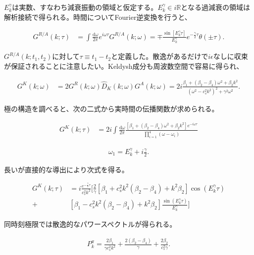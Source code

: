 \documentclass[a4paper,11pt]{ltjsarticle}
\numberwithin{equation}{section}
\newcommand{\dd}{\mathrm{d}}
\newcommand{\ee}{e}
\begin{document}
$E_k^\gamma$は実数、すなわち減衰振動の領域と仮定する。$E_k^\gamma\in i\mathbb R$となる過減衰の領域は解析接続で得られる。時間についてFourier逆変換を行うと、

\begin{align}\label{eq:retardedM4dissip}
G^{R/A} (k; \tau) &= \int \frac{\dd \omega}{2\pi} \ee^{i \omega \tau} G^{R/A} (k; \omega) = \mp \frac{\sin \left[E_k^{\gamma} \tau\right]}{E_k^{\gamma}} \ee^{- \frac{\gamma}{2}\tau}\theta\left(\pm \tau\right).
\end{align}

$G^{R/A}(k;t_1,t_2)$に対して$\tau\equiv t_1-t_2$と定義した。散逸があるだけで$i\epsilon$なしに収束が保証されることに注意したい。Keldysh成分も周波数空間で容易に得られ、

\begin{align}
G^{K} (k; \omega) &= 2 G^{R} (k; \omega) \widehat{D}_K (k; \omega) G^{A} (k; \omega) = 2 i \frac{\beta_1+ (\beta_{2}-\beta_{4}) \omega^2 + \beta_2 k^2 }{\left(\omega^2-c_s^2k^2\right)^2+\gamma^2 \omega^2}.
\end{align}

極の構造を調べると、次の二式から実時間の伝播関数が求められる。

\begin{align}
G^{K} (k; \tau) &= 2 i \int \frac{\dd \omega}{2\pi} \frac{\left[\beta_1+ (\beta_{2}-\beta_{4}) \omega^2 + \beta_2 k^2 \right] \ee^{-i\omega \tau}}{\prod_{i=1}^{4}(\omega-\omega_i)}
\end{align}


\begin{align}
\omega_1 = E_k^{\gamma} + i \frac{\gamma}{2}.
\end{align}

長いが直接的な導出により次式を得る。

\begin{align}\label{eq:distribM4dissip}
G^{K} (k; \tau) &= i \frac{\ee^{-\frac{\gamma}{2}\tau}}{c_s^2 k^2} \bigg[\frac{2}{\gamma} \left[\beta_1 +c_s^2 k^2  (\beta_{2}-\beta_{4})+ k^2 \beta_2\right]\cos\left(E_k^{\gamma} \tau\right) \nonumber \\
+& \left[\beta_1 - c_s^2 k^2 (\beta_{2}-\beta_{4})+ k^2 \beta_2\right]\frac{\sin\left(E_k^{\gamma} \tau\right)}{E_k^{\gamma}}\bigg]
\end{align}

同時刻極限では散逸的なパワースペクトルが得られる。

\begin{align}
P^\pi_k = \frac{2 \beta_1}{\gamma c_s^2k^2} + \frac{2 (\beta_{2}-\beta_{4})}{\gamma} + \frac{2\beta_2}{c_s^2\gamma}.
\end{align}
\end{document}
